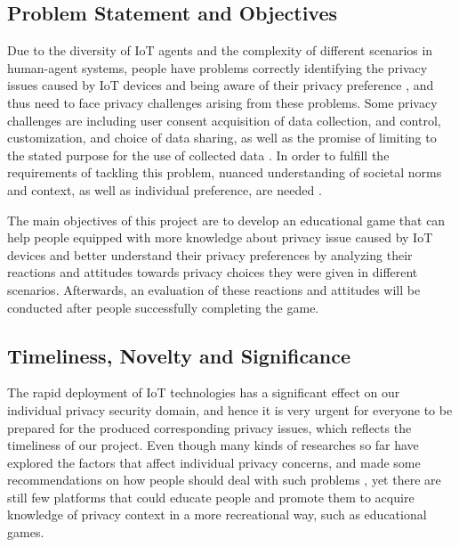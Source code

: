 \documentclass[a4paper,11pt]{article}
\begin{document}
\subsection{Problem Statement and Objectives}


Due to the diversity of IoT agents and the complexity of different scenarios in human-agent systems, people have problems correctly identifying the privacy issues caused by IoT devices and being aware of their privacy preference \cite{Alhalafi_2019}, and thus need to face privacy challenges arising from these problems. Some privacy challenges are including user consent acquisition of data collection, and control, customization, and choice of data sharing, as well as the promise of limiting to the stated purpose for the use of collected data \cite{7116422}. In order to fulfill the requirements of tackling this problem, nuanced understanding of societal norms and context, as well as individual preference, are needed \cite{privacy, Beate_2005}.

The main objectives of this project are to develop an educational game that can help people equipped with more knowledge about privacy issue caused by IoT devices and better understand their privacy preferences by analyzing their reactions and attitudes towards privacy choices they were given in different scenarios. Afterwards, an evaluation of these reactions and attitudes will be conducted after people successfully completing the game.




\subsection{Timeliness, Novelty and Significance}

The rapid deployment of IoT technologies has a significant effect on our individual privacy security domain, and hence it is very urgent for everyone to be prepared for the produced corresponding privacy issues, which reflects the timeliness of our project. Even though many kinds of researches so far have explored the factors that affect individual privacy concerns, and made some recommendations on how people should deal with such problems \cite{Lin12expectationand,Tsai09whosviewed,Lederer03whowants,Naeini:2017}, yet there are still few platforms that could educate people and promote them to acquire knowledge of privacy context in a more recreational way, such as educational games. 
\end{document}
